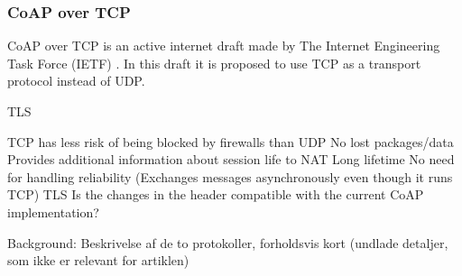 \subsubsection{CoAP over TCP}
CoAP over TCP is an active internet draft made by The Internet Engineering Task Force (IETF) \cite{IETF}. 
In this draft it is proposed to use TCP as a transport protocol instead of UDP.

TLS
   
TCP has less risk of being blocked by firewalls than UDP
No lost packages/data
Provides additional information about session life to NAT
Long lifetime
No need for handling reliability
(Exchanges messages asynchronously even though it runs TCP)
TLS
Is the changes in the header compatible with the current CoAP implementation?


Background: Beskrivelse af de to protokoller, forholdsvis kort (undlade detaljer, som ikke er relevant for artiklen)


